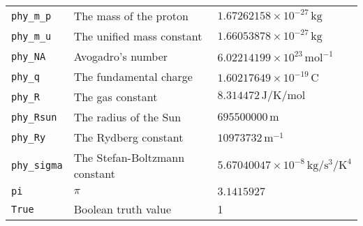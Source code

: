 \begin{landscape}
\begin{center}
\begin{longtable}{|lll|}
{\tt phy\_m\_p} & The mass of the proton & $1.67262158\times10^{-27}\,\mathrm{kg}$ \\
{\tt phy\_m\_u} & The unified mass constant & $1.66053878\times10^{-27}\,\mathrm{kg}$ \\
{\tt phy\_NA} & Avogadro's number & $6.02214199\times10^{23}\,\mathrm{mol}^{-1}$ \\
{\tt phy\_q} & The fundamental charge & $1.60217649\times10^{-19}\,\mathrm{C}$ \\
{\tt phy\_R} & The gas constant & $8.314472\,\mathrm{J}/\mathrm{K}/\mathrm{mol}$ \\
{\tt phy\_Rsun} & The radius of the Sun & $695500000\,\mathrm{m}$ \\
{\tt phy\_Ry} & The Rydberg constant & $10973732\,\mathrm{m}^{-1}$ \\
{\tt phy\_sigma} & The Stefan-Boltzmann constant & $5.67040047\times10^{-8}\,\mathrm{kg}/\mathrm{s}^{3}/\mathrm{K}^{4}$ \\
{\tt pi} & $\pi$ & $3.1415927$ \\
{\tt True} & Boolean truth value & 1 \\
\hline
\end{longtable}
\end{center}
\end{landscape}

